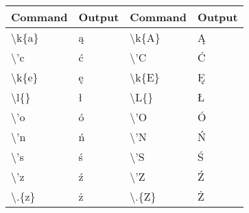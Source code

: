 \documentclass[a4paper,11pt]{article}
\begin{document}
\begin{table}
\begin{center}
\begin{tabular}{|ll|ll|}
\hline Command & Output & Command & Output \\ \hline
\textbackslash k\{a\} & \k{a} & \textbackslash k\{A\} & \k{A} \\ \hline 
\textbackslash 'c & \'c & \textbackslash 'C & \'C \\ \hline 
\textbackslash k\{e\} & \k{e} & \textbackslash k\{E\} & \k{E} \\ \hline
\textbackslash l\{\} & \l{} & \textbackslash L\{\} & \L{} \\ \hline 
\textbackslash 'o & \'o & \textbackslash 'O & \'O \\ \hline 
\textbackslash 'n & \'n & \textbackslash 'N & \'N \\ \hline 
\textbackslash 's & \'s & \textbackslash 'S & \'S \\ \hline 
\textbackslash 'z & \'z & \textbackslash 'Z & \'Z \\ \hline 
\textbackslash .\{z\} & \.{z} & \textbackslash .\{Z\} & \.{Z} \\ \hline 


\end{tabular}
\end{center}
\end{table}
\end{document}
